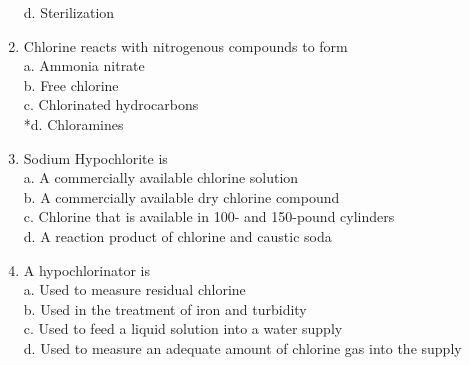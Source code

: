 \begin{enumerate}[1.]
d. Sterilization\\
\item Chlorine reacts with nitrogenous compounds to form\\
a. Ammonia nitrate\\
b. Free chlorine\\
c. Chlorinated hydrocarbons\\
*d. Chloramines\\
\item Sodium Hypochlorite is\\
a. A commercially available chlorine solution\\
b. A commercially available dry chlorine compound\\
c. Chlorine that is available in 100- and 150-pound cylinders\\
d. A reaction product of chlorine and caustic soda\\
\item A hypochlorinator is\\
a. Used to measure residual chlorine\\
b. Used in the treatment of iron and turbidity\\
c. Used to feed a liquid solution into a water supply\\
d. Used to measure an adequate amount of chlorine gas into the supply\\


\end{enumerate}
